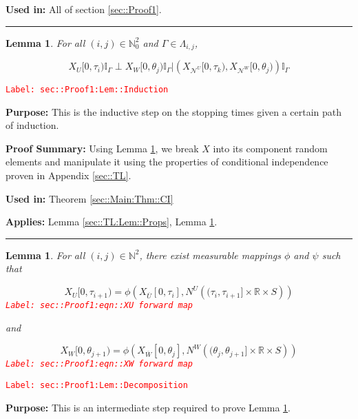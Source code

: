 \documentclass[12pt]{article}
\newcommand{\mb}{\mathbb}
\newcommand{\mc}{\mathcal}
\newcommand{\ov}{\overline}
\newcommand{\tr}{\textcolor{red}}
\newcommand{\labe}[1]{\tr{\texttt{Label: #1}}}
\newcommand{\purpose}{\textbf{Purpose: }}
\newcommand{\pfsum}{\textbf{Proof Summary: }}
\newcommand{\usein}{\textbf{Used in: }}
\newcommand{\app}{\textbf{Applies: }}
\newcommand{\lin}{\rule{\linewidth}{0.4 pt}}
\renewcommand{\U}{U}							%
\newcommand{\UU}{W}								%
\renewcommand{\S}{S}							%
\newcommand{\X}{X}								%
\newcommand{\neigh}{\mc{N}}						%
\newcommand{\vind}[1]{^{#1}}					%
\newcommand{\cind}[1]{_{#1}}					%
\newcommand{\cl}{\ov}							%
\newcommand{\tip}[1]{#1}						%
\newcommand{\poiss}{N}							%
\newcommand{\indx}[1]{_{#1}}					%
\newcommand{\rt}{\tau}							%
\newcommand{\rtt}{\theta}						%
\renewcommand{\it}{k}							%
\newcommand{\apath}{\Gamma}						%
\newcommand{\pathset}[2]{\Lambda_{#1,#2}}		%
\newtheorem{lem}[thms]{Lemma}
\begin{document}
\usein All of section \ref{sec::Proof1}.

\lin

\begin{lem}
For all \((i,j)\in \mb{N}_0^2\) and \(\apath \in \pathset{i}{j}\),

\[\X\cind{\U}\tip{[0,\rt\indx{i})}\mb{I}_{\apath}\perp \X\cind{\UU}\tip{[0,\rtt\indx{j})}\mb{I}_{\apath}|\left(\X\cind{\neigh\vind{\U}}\tip{[0,\rt\indx{\it})},\X\cind{\neigh\vind{\UU}}\tip{[0,\rtt\indx{j})}\right)\mb{I}_{\apath}\]
\label{sec::Proof1:Lem::Induction}
\end{lem}
\labe{sec::Proof1:Lem::Induction}

\purpose This is the inductive step on the stopping times given a certain path of induction.

\pfsum Using Lemma \ref{sec::Proof1:Lem::Decomposition}, we break \(\X\) into its component random elements and manipulate it using the properties of conditional independence proven in Appendix \ref{sec::TL}.

\usein Theorem \ref{sec::Main:Thm::CI}

\app Lemma \ref{sec::TL:Lem::Props}, Lemma \ref{sec::Proof1:Lem::Decomposition}.

\lin

\begin{lem}
For all \((i,j)\in \mb{N}^2\), there exist measurable mappings \(\phi\) and \(\psi\) such that 

\begin{equation}
\X\cind{\U}\tip{[0,\rt\indx{i+1})} = \phi\left(\X\cind{\cl{\U}}\tip{[0,\rt\indx{i}]}, \poiss\vind{\U}\left((\rt\indx{i}, \rt\indx{i+1}]\times \mb{R}\times \S\right)\right)
\label{sec::Proof1:eqn::XU forward map}
\end{equation}
\labe{sec::Proof1:eqn::XU forward map}

and

\begin{equation}
\X\cind{\UU}\tip{[0,\rtt\indx{j+1})} = \phi\left(\X\cind{\cl{\UU}}\tip{[0,\rtt\indx{j}]}, \poiss\vind{\UU}\left((\rtt\indx{j}, \rtt\indx{j+1}]\times \mb{R}\times \S\right)\right)
\label{sec::Proof1:eqn::XW forward map}
\end{equation}
\labe{sec::Proof1:eqn::XW forward map}

\label{sec::Proof1:Lem::Decomposition}
\end{lem}
\labe{sec::Proof1:Lem::Decomposition}

\purpose This is an intermediate step required to prove Lemma \ref{sec::Proof1:Lem::Induction}.
\end{document}
